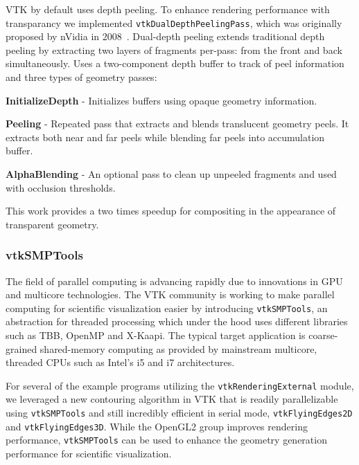 VTK by default uses depth peeling. To enhance rendering performance with transparancy we implemented \texttt{vtkDualDepthPeelingPass}, which was originally proposed by nVidia in 2008~\cite{Bavoil:2008}. Dual-depth peeling extends traditional depth peeling by extracting two layers of fragments per-pass: from the front and back simultaneously. Uses a two-component depth buffer to track of peel information and three types of geometry passes:

\begin{compactitem}
\item \textbf{InitializeDepth} - Initializes buffers using opaque geometry information.
\item \textbf{Peeling} - Repeated pass that extracts and blends translucent geometry peels. It extracts both near and far peels while blending far peels into accumulation buffer.
\item \textbf{AlphaBlending} - An optional pass to clean up unpeeled fragments and used with occlusion thresholds.
\end{compactitem}

This work provides a two times speedup for compositing in the appearance of transparent geometry.

\subsubsection{vtkSMPTools}

The field of parallel computing is advancing rapidly due to innovations in GPU and multicore technologies. The VTK community is working to make parallel computing for scientific visualization easier by introducing \texttt{vtkSMPTools}, an abstraction for threaded processing which under the hood uses different libraries such as TBB, OpenMP and X-Kaapi. The typical target application is coarse-grained shared-memory computing as provided by mainstream multicore, threaded CPUs such as Intel's i5 and i7 architectures.

For several of the example programs utilizing the \texttt{vtkRenderingExternal} module, we leveraged a new contouring algorithm in VTK that is readily parallelizable using \texttt{vtkSMPTools} and still incredibly efficient in serial mode, \texttt{vtkFlyingEdges2D} and \texttt{vtkFlyingEdges3D}. While the OpenGL2 group improves rendering performance, \texttt{vtkSMPTools} can be used to enhance the geometry generation performance for scientific visualization.